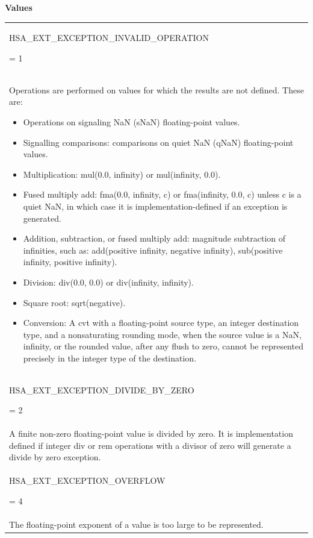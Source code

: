 \documentclass[final]{book}
\newcommand{\reftyp}[1]{#1}
\newcommand{\refenu}[1]{\reftyp{#1}}
\begin{document}
\noindent\textbf{Values}\\[-5mm]
\begin{longtable}{@{\hspace{2em}}p{\linewidth-2em}}
\hspace{-2em}\hypertarget{group__finalizer_1ggaac4b20de831dd17c83c1e2110bac0ef2af3acf5b85fdfd50083ba20eb4142bb9f}{\refenu{HSA_\-EXT_\-EXCEPTION_\-INVALID_\-OPERATION}} = 1\\Operations are performed on values for which the results are not defined. These are:
\begin{itemize}\item Operations on signaling NaN (sNaN) floating-point values.
\item Signalling comparisons: comparisons on quiet NaN (qNaN) floating-point values.
\item Multiplication: mul(0.0, infinity) or mul(infinity, 0.0).
\item Fused multiply add: fma(0.0, infinity, c) or fma(infinity, 0.0, c) unless c is a quiet NaN, in which case it is implementation-defined if an exception is generated.
\item Addition, subtraction, or fused multiply add: magnitude subtraction of infinities, such as: add(positive infinity, negative infinity), sub(positive infinity, positive infinity).
\item Division: div(0.0, 0.0) or div(infinity, infinity).
\item Square root: sqrt(negative).
\item Conversion: A cvt with a floating-point source type, an integer destination type, and a nonsaturating rounding mode, when the source value is a NaN, infinity, or the rounded value, after any flush to zero, cannot be represented precisely in the integer type of the destination. 
\end{itemize}\\[2mm]
\hspace{-2em}\hypertarget{group__finalizer_1ggaac4b20de831dd17c83c1e2110bac0ef2adf54889632462cdeb6bbf4f36d0f630c}{\refenu{HSA_\-EXT_\-EXCEPTION_\-DIVIDE_\-BY_\-ZERO}} = 2\\A finite non-zero floating-point value is divided by zero. It is implementation defined if integer div or rem operations with a divisor of zero will generate a divide by zero exception.\\[2mm]
\hspace{-2em}\hypertarget{group__finalizer_1ggaac4b20de831dd17c83c1e2110bac0ef2a3cffa261ec9fbb0910b0ed11ea17126e}{\refenu{HSA_\-EXT_\-EXCEPTION_\-OVERFLOW}} = 4\\The floating-point exponent of a value is too large to be represented.\\[2mm]

\end{longtable}
\end{document}
